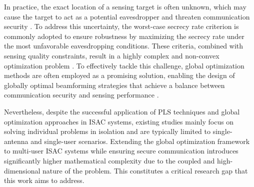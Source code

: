 \documentclass[runningheads]{llncs}
\begin{document}
In practice, the exact location of a sensing target is often unknown, which may cause the target to act as a potential eavesdropper and threaten communication security \cite{hou2024optimal}. To address this uncertainty, the worst-case secrecy rate criterion is commonly adopted to ensure robustness by maximizing the secrecy rate under the most unfavorable eavesdropping conditions. These criteria, combined with sensing quality constraints, result in a highly complex and non-convex optimization problem \cite{ren2024secure}. To effectively tackle this challenge, global optimization methods are often employed as a promising solution, enabling the design of globally optimal beamforming strategies that achieve a balance between communication security and sensing performance \cite{xu2023sensing, xu2025sensing}.

Nevertheless, despite the successful application of PLS techniques and global optimization approaches in ISAC systems, existing studies mainly focus on solving individual problems in isolation and are typically limited to single-antenna and single-user scenarios. Extending the global optimization framework to multi-user ISAC systems while ensuring secure communication introduces significantly higher mathematical complexity due to the coupled and high-dimensional nature of the problem. This constitutes a critical research gap that this work aims to address.

\end{document}
